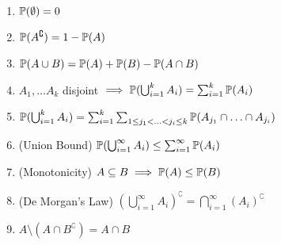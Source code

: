 \begin{enumerate}
  \item \(\P(\emptyset) = 0\)
  \item \(\P(A^\complement) = 1 - \P(A)\)
  \item \(\P(A \cup B) = \P(A) + \P(B) - \P(A \cap B)\)
  \item \(A_1, \ldots A_k\) disjoint \(\implies \P(\bigcup_{i=1}^k A_i) = \sum_{i=1}^k \P(A_i)\)
  \item \(\P(\bigcup_{i=1}^k A_i) = \sum_{i=1}^k \sum_{1 \leq j_1 < \ldots < j_i \leq k} \P(A_{j_1} \cap \ldots \cap A_{j_i})\)
  \item (Union Bound) \(\P(\bigcup_{i=1}^\infty A_i) \leq \sum_{i=1}^\infty \P(A_i)\)
  \item (Monotonicity) \(A \subseteq B \implies \P(A) \leq \P(B)\)
  \item (De Morgan's Law) \((\bigcup_{i=1}^\infty A_i)^\complement = \bigcap_{i=1}^\infty (A_i)^\complement\)
  \item \(A \setminus (A \cap B^\complement) = A \cap B\)
\end{enumerate}

